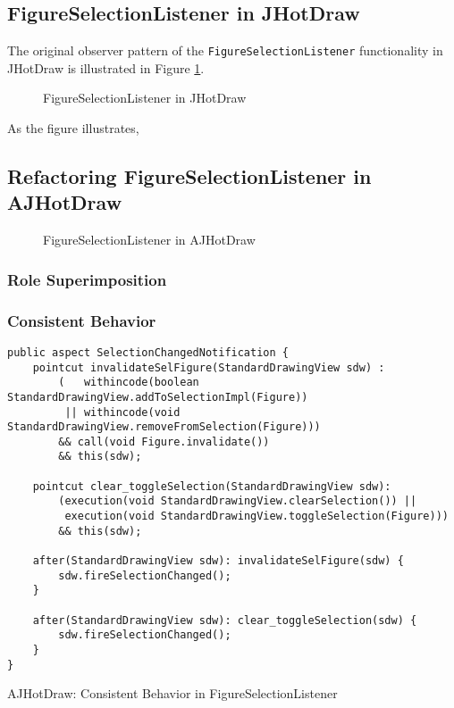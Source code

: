 \subsection{FigureSelectionListener in JHotDraw}
The original observer pattern of the \texttt{FigureSelectionListener} functionality in JHotDraw is illustrated in Figure \ref{fig:JHotDraw_FigureSelectionListener_OOP}.

\begin{figure}[H]
	\centering
  	\caption{FigureSelectionListener in JHotDraw}
  	\label{fig:JHotDraw_FigureSelectionListener_OOP}
\end{figure}

As the figure illustrates, 

\subsection{Refactoring FigureSelectionListener in AJHotDraw}

\begin{figure}[H]
	\centering
  	\caption{FigureSelectionListener in AJHotDraw}
  	\label{fig:JHotDraw_FigureSelectionListener_AOP}
\end{figure}

\subsubsection{Role Superimposition}

\subsubsection{Consistent Behavior}
\begin{sourcecode} [H]
	\begin{lstlisting}[language=AspectJ, escapechar=|]
public aspect SelectionChangedNotification {
	pointcut invalidateSelFigure(StandardDrawingView sdw) :
		(   withincode(boolean StandardDrawingView.addToSelectionImpl(Figure)) 
		 || withincode(void StandardDrawingView.removeFromSelection(Figure)))
		&& call(void Figure.invalidate()) 
		&& this(sdw);

	pointcut clear_toggleSelection(StandardDrawingView sdw):
		(execution(void StandardDrawingView.clearSelection()) ||
		 execution(void StandardDrawingView.toggleSelection(Figure)))
		&& this(sdw);

	after(StandardDrawingView sdw): invalidateSelFigure(sdw) {
		sdw.fireSelectionChanged();
	}

	after(StandardDrawingView sdw): clear_toggleSelection(sdw) {
		sdw.fireSelectionChanged();
	}
}
	\end{lstlisting}
	\caption{AJHotDraw: Consistent Behavior in FigureSelectionListener}
	\label{lst:Consistent Behavior in FigureSelectionListener}
\end{sourcecode}


